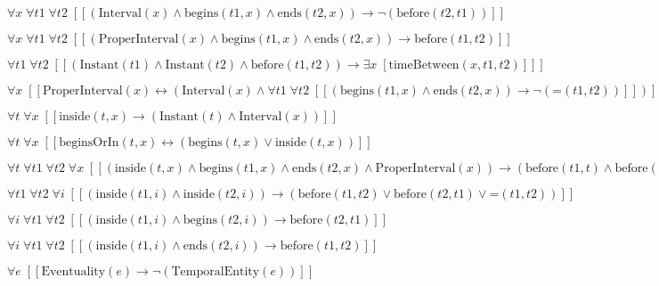\documentclass{article}
\begin{document}
$\forall x\; \forall t1\; \forall t2\;  \left[ \left[ \left(\textrm{Interval}(x) \land \textrm{begins}(t1,x) \land \textrm{ends}(t2,x)\right) \rightarrow \neg \left(\textrm{before}(t2,t1)\right) \right] \right]$

$\forall x\; \forall t1\; \forall t2\;  \left[ \left[ \left(\textrm{ProperInterval}(x) \land \textrm{begins}(t1,x) \land \textrm{ends}(t2,x)\right) \rightarrow \textrm{before}(t1,t2) \right] \right]$

$\forall t1\; \forall t2\;  \left[ \left[ \left(\textrm{Instant}(t1) \land \textrm{Instant}(t2) \land \textrm{before}(t1,t2)\right) \rightarrow \exists x\;  \left[ \textrm{timeBetween}(x,t1,t2) \right] \right] \right]$

$\forall x\;  \left[ \left[ \textrm{ProperInterval}(x) \leftrightarrow \left(\textrm{Interval}(x) \land \forall t1\; \forall t2\;  \left[ \left[ \left(\textrm{begins}(t1,x) \land \textrm{ends}(t2,x)\right) \rightarrow \neg \left(\textrm{=}(t1,t2)\right) \right] \right]\right) \right] \right]$

$\forall t\; \forall x\;  \left[ \left[ \textrm{inside}(t,x) \rightarrow \left(\textrm{Instant}(t) \land \textrm{Interval}(x)\right) \right] \right]$

$\forall t\; \forall x\;  \left[ \left[ \textrm{beginsOrIn}(t,x) \leftrightarrow \left(\textrm{begins}(t,x) \lor \textrm{inside}(t,x)\right) \right] \right]$

$\forall t\; \forall t1\; \forall t2\; \forall x\;  \left[ \left[ \left(\textrm{inside}(t,x) \land \textrm{begins}(t1,x) \land \textrm{ends}(t2,x) \land \textrm{ProperInterval}(x)\right) \rightarrow \left(\textrm{before}(t1,t) \land \textrm{before}(t,t2)\right) \right] \right]$

$\forall t1\; \forall t2\; \forall i\;  \left[ \left[ \left(\textrm{inside}(t1,i) \land \textrm{inside}(t2,i)\right) \rightarrow \left(\textrm{before}(t1,t2) \lor \textrm{before}(t2,t1) \lor \textrm{=}(t1,t2)\right) \right] \right]$

$\forall i\; \forall t1\; \forall t2\;  \left[ \left[ \left(\textrm{inside}(t1,i) \land \textrm{begins}(t2,i)\right) \rightarrow \textrm{before}(t2,t1) \right] \right]$

$\forall i\; \forall t1\; \forall t2\;  \left[ \left[ \left(\textrm{inside}(t1,i) \land \textrm{ends}(t2,i)\right) \rightarrow \textrm{before}(t1,t2) \right] \right]$

$\forall e\;  \left[ \left[ \textrm{Eventuality}(e) \rightarrow \neg \left(\textrm{TemporalEntity}(e)\right) \right] \right]$
\end{document}
